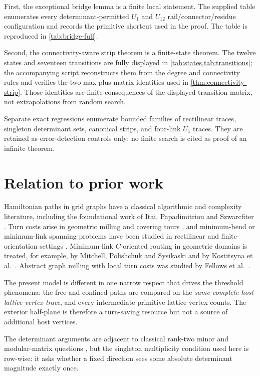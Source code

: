 \documentclass[11pt]{article}
\theoremstyle{definition}
\begin{document}
First, the exceptional bridge lemma is a finite local statement.  The supplied table enumerates every determinant-permitted $U_1$ and $U_{12}$ rail/connector/residue configuration and records the primitive shortcut used in the proof.  The table is reproduced in \cref{tab:bridge-full}.

Second, the connectivity-aware strip theorem is a finite-state theorem.  The twelve states and seventeen transitions are fully displayed in \cref{tab:states,tab:transitions}; the accompanying script reconstructs them from the degree and connectivity rules and verifies the two max-plus matrix identities used in \cref{thm:connectivity-strip}.  Those identities are finite consequences of the displayed transition matrix, not extrapolations from random search.

Separate exact regressions enumerate bounded families of rectilinear traces, singleton determinant sets, canonical strips, and four-link $U_1$ traces.  They are retained as error-detection controls only; no finite search is cited as proof of an infinite theorem.

\section{Relation to prior work}\label{sec:related}
Hamiltonian paths in grid graphs have a classical algorithmic and complexity literature, including the foundational work of Itai, Papadimitriou and Szwarcfiter \cite{Itai1982}.  Turn costs arise in geometric milling and covering tours \cite{Arkin2005,FeketeKrupke2024}, and minimum-bend or minimum-link spanning problems have been studied in rectilinear and finite-orientation settings \cite{Estivill2010,Estivill2011,Wang2014}.  Minimum-link $C$-oriented routing in geometric domains is treated, for example, by Mitchell, Polishchuk and Sysikaski \cite{Mitchell2014} and by Kostitsyna et al.\ \cite{Kostitsyna2017}.  Abstract graph milling with local turn costs was studied by Fellows et al.\ \cite{Fellows2009}.

The present model is different in one narrow respect that drives the threshold phenomena: the free and confined paths are compared on the \emph{same complete host-lattice vertex trace}, and every intermediate primitive lattice vertex counts.  The exterior half-plane is therefore a turn-saving resource but not a source of additional host vertices.

The determinant arguments are adjacent to classical rank-two minor and modular-matrix questions \cite{Heller1957,OxleyWalsh2022}, but the singleton multiplicity condition used here is row-wise: it asks whether a fixed direction sees some absolute determinant magnitude exactly once.
\end{document}
